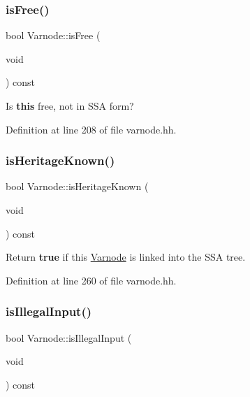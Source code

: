 \subsubsection{\texorpdfstring{isFree()}{isFree()}}
{\footnotesize\ttfamily bool Varnode\+::is\+Free (\begin{DoxyParamCaption}\item[{void}]{ }\end{DoxyParamCaption}) const\hspace{0.3cm}{\ttfamily [inline]}}



Is {\bfseries{this}} free, not in S\+SA form? 



Definition at line 208 of file varnode.\+hh.

\mbox{\label{class_varnode_a110890cf5213263aa7ee1f2dc47c1acd}} 
\subsubsection{\texorpdfstring{isHeritageKnown()}{isHeritageKnown()}}
{\footnotesize\ttfamily bool Varnode\+::is\+Heritage\+Known (\begin{DoxyParamCaption}\item[{void}]{ }\end{DoxyParamCaption}) const\hspace{0.3cm}{\ttfamily [inline]}}



Return {\bfseries{true}} if this \mbox{\hyperlink{class_varnode}{Varnode}} is linked into the S\+SA tree. 



Definition at line 260 of file varnode.\+hh.

\mbox{\label{class_varnode_a6d3bb6ddab597923f9a734f3985d12e2}} 
\subsubsection{\texorpdfstring{isIllegalInput()}{isIllegalInput()}}
{\footnotesize\ttfamily bool Varnode\+::is\+Illegal\+Input (\begin{DoxyParamCaption}\item[{void}]{ }\end{DoxyParamCaption}) const\hspace{0.3cm}{\ttfamily [inline]}}




